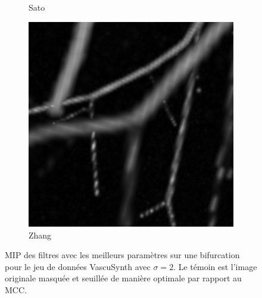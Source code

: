 \begin{figure}[!ht]
\begin{subfigure}[t]{0.30\textwidth}
      \caption{Sato}
    \end{subfigure}
    \begin{subfigure}[t]{0.30\textwidth}
      \includegraphics[clip = true, trim  =  170 230 150 240, width=\textwidth]{Images/Vascu_2_k_Zhang.png}
      \caption{Zhang}
    \end{subfigure}

        \caption{MIP des filtres avec les meilleurs paramètres sur une bifurcation pour le jeu de données VascuSynth avec $\sigma=2$. Le témoin est l'image originale masquée et seuillée de manière optimale par rapport au MCC.
        }
      \label{fig:bifurcation_vascu}
  \end{figure}
